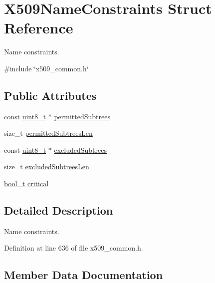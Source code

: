 \hypertarget{structX509NameConstraints}{}\section{X509\+Name\+Constraints Struct Reference}
\label{structX509NameConstraints}


Name constraints.  




{\ttfamily \#include \char`\"{}x509\+\_\+common.\+h\char`\"{}}

\subsection*{Public Attributes}
\begin{DoxyCompactItemize}
\item 
const \hyperlink{stdint_8h_aba7bc1797add20fe3efdf37ced1182c5}{uint8\+\_\+t} $\ast$ \hyperlink{structX509NameConstraints_a156421797fb4821bee39cfc265a0c2da}{permitted\+Subtrees}
\item 
size\+\_\+t \hyperlink{structX509NameConstraints_aaada0ccb4f22f65db2b71493b14327c0}{permitted\+Subtrees\+Len}
\item 
const \hyperlink{stdint_8h_aba7bc1797add20fe3efdf37ced1182c5}{uint8\+\_\+t} $\ast$ \hyperlink{structX509NameConstraints_a187e11b65d21e9eb4c9124c133c0fbbc}{excluded\+Subtrees}
\item 
size\+\_\+t \hyperlink{structX509NameConstraints_a5f03d1d2e8b8eddf4f1e99bbb61254af}{excluded\+Subtrees\+Len}
\item 
\hyperlink{compiler__port_8h_a812d16e5494522586b3784e55d479912}{bool\+\_\+t} \hyperlink{structX509NameConstraints_a635bd3b8e0e3ec7a232529ad58f9594b}{critical}
\end{DoxyCompactItemize}


\subsection{Detailed Description}
Name constraints. 

Definition at line 636 of file x509\+\_\+common.\+h.



\subsection{Member Data Documentation}
\mbox{\label{structX509NameConstraints_a635bd3b8e0e3ec7a232529ad58f9594b}} 
